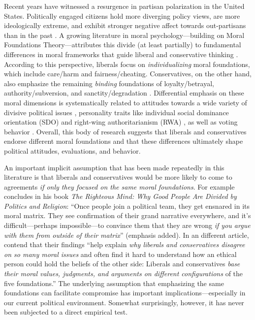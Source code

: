 Recent years have witnessed a resurgence in partisan polarization in the United States. Politically engaged citizens hold more diverging policy
views, are more ideologically extreme, and exhibit stronger negative affect towards out-partisans than in the past \citep{hetherington2001resurgent, abramowitz2008polarization, iyengar2012affect, mason2014disrespectfully, huddy2015expressive, iyengar2015fear}. A growing literature in moral psychology---building on Moral Foundations Theory---attributes this divide (at least partially) to fundamental differences in moral frameworks that guide liberal and conservative thinking \citep[c.f.,][]{haidt2012righteous}. According to this perspective, liberals focus on \emph{individualizing} moral foundations, which include care/harm and fairness/cheating. Conservatives, on the other hand, also emphasize the remaining \emph{binding} foundations of loyalty/betrayal, authority/subversion, and sanctity/degradation \citep{haidt2007morality, graham2009liberals}. Differential emphasis on these moral dimensions is systematically related to attitudes towards a wide variety of divisive political issues \citep[e.g.][]{koleva2012tracing, kertzer2014moral, low2015moral}, personality traits like individual social dominance orientation (SDO) and right-wing authoritarianism (RWA) \citep{federico2013mapping}, as well as voting behavior \citep{franks2015using}. Overall, this body of research suggests that liberals and conservatives endorse different moral foundations and that these differences ultimately shape political attitudes, evaluations, and behavior.

An important implicit assumption that has been made repeatedly in this literature is that liberals and conservatives would be more likely to come to agreements \emph{if only they focused on the same moral foundations}. For example \citet[365]{haidt2012righteous} concludes in his book \emph{The Righteous Mind: Why Good People Are Divided by Politics and Religion}: ``Once people join a political team, they get ensnared in its moral matrix. They see confirmation of their grand
narrative everywhere, and it's difficult---perhaps impossible---to convince them that they are wrong \emph{if you argue with them from outside of their matrix}'' (emphasis added). In an different article, \citet[1040]{graham2009liberals} contend that their findings ``help explain \emph{why liberals and conservatives disagree on so many moral issues} and often find it hard to understand how an ethical person could hold the beliefs of the other side: Liberals and conservatives \emph{base their moral values, judgments, and arguments on different configurations} of the five foundations.'' The underlying assumption that emphasizing the same foundations can facilitate compromise has important implications---especially in our current political environment. Somewhat surprisingly, however, it has never been subjected to a direct empirical test.

